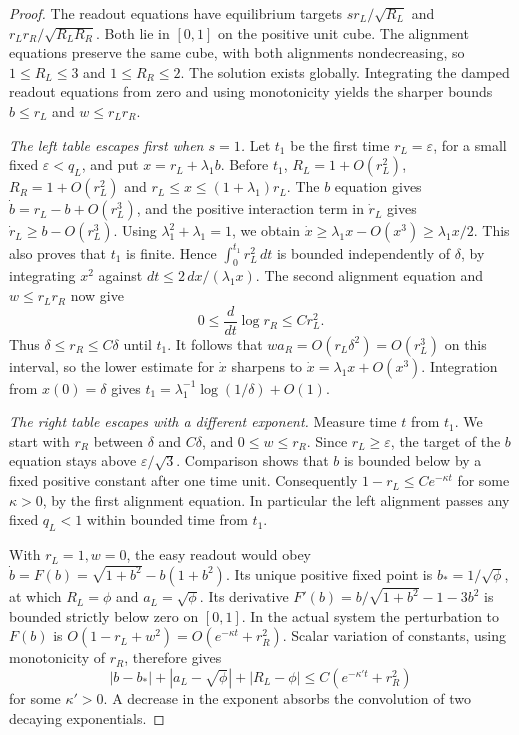 \begin{proof}
The readout equations have equilibrium targets $sr_L/\sqrt{R_L}$
and $r_Lr_R/\sqrt{R_LR_R}$. Both lie in $[0,1]$ on the positive unit
cube. The alignment equations preserve the same cube, with both alignments
nondecreasing, so $1\le R_L\le3$ and $1\le R_R\le2$. The solution exists
globally. Integrating the damped readout equations from zero and using
monotonicity yields the sharper bounds $b\le r_L$ and $w\le r_Lr_R$.

\emph{The left table escapes first when $s=1$.}
Let $t_1$ be the first time $r_L=\varepsilon$, for a small fixed
$\varepsilon<q_L$, and put $x=r_L+\lambda_1 b$. Before $t_1$,
$R_L=1+O(r_L^2)$, $R_R=1+O(r_L^2)$ and $r_L\le x\le(1+\lambda_1)r_L$.
The $b$ equation gives $\dot b=r_L-b+O(r_L^3)$, and the positive
interaction term in $\dot r_L$ gives $\dot r_L\ge b-O(r_L^3)$.
Using $\lambda_1^2+\lambda_1=1$, we obtain
$\dot x\ge\lambda_1x-O(x^3)\ge\lambda_1x/2$. This also proves
that $t_1$ is finite. Hence $\int_0^{t_1}r_L^2\,dt$ is bounded
independently of $\delta$, by integrating $x^2$ against
$dt\le2\,dx/(\lambda_1x)$.
The second alignment equation and $w\le r_Lr_R$ now give
\[
 0\le\frac{d}{dt}\log r_R\le C r_L^2 .
\]
Thus $\delta\le r_R\le C\delta$ until $t_1$. It follows that
$wa_R=O(r_L\delta^2)=O(r_L^3)$ on this interval, so the lower estimate
for $\dot x$ sharpens to $\dot x=\lambda_1 x+O(x^3)$.
Integration from $x(0)=\delta$ gives
$t_1=\lambda_1^{-1}\log(1/\delta)+O(1)$.

\emph{The right table escapes with a different exponent.}
Measure time $t$ from $t_1$. We start with $r_R$ between $\delta$ and
$C\delta$, and $0\le w\le r_R$. Since $r_L\ge\varepsilon$, the target
of the $b$ equation stays above $\varepsilon/\sqrt3$. Comparison shows
that $b$ is bounded below by a fixed positive constant after one time
unit. Consequently $1-r_L\le Ce^{-\kappa t}$ for some $\kappa>0$, by
the first alignment equation. In particular the left alignment passes
any fixed $q_L<1$ within bounded time from $t_1$.

With $r_L=1,w=0$, the easy readout would obey
$\dot b=F(b)=\sqrt{1+b^2}-b(1+b^2)$.
Its unique positive fixed point is $b_*=1/\sqrt\phi$, at which
$R_L=\phi$ and $a_L=\sqrt\phi$. Its derivative
$F'(b)=b/\sqrt{1+b^2}-1-3b^2$ is bounded strictly below zero on $[0,1]$.
In the actual system the perturbation to $F(b)$ is
$O(1-r_L+w^2)=O(e^{-\kappa t}+r_R^2)$.
Scalar variation of constants, using monotonicity of $r_R$, therefore gives
\[
 |b-b_*|+|a_L-\sqrt\phi|+|R_L-\phi|
 \le C(e^{-\kappa' t}+r_R^2)
\]
for some $\kappa'>0$. A decrease in the exponent absorbs the convolution
of two decaying exponentials.


\end{proof}
